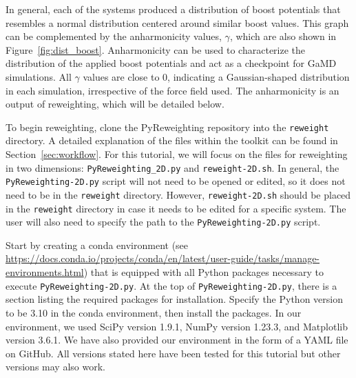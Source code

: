 \documentclass[9pt,tutorial]{livecoms}
\begin{document}
In general, each of the systems produced a distribution of boost potentials that resembles a normal distribution centered around similar boost values. This graph can be complemented by the anharmonicity values, $\gamma$, which are also shown in Figure~\ref{fig:dist_boost}. Anharmonicity can be used to characterize the distribution of the applied boost potentials and act as a checkpoint for GaMD simulations. All $\gamma$ values are close to 0, indicating a Gaussian-shaped distribution in each simulation, irrespective of the force field used. The anharmonicity is an output of reweighting, which will be detailed below.

To begin reweighting, clone the PyReweighting repository into the \texttt{reweight} directory. A detailed explanation of the files within the toolkit can be found in Section~\ref{sec:workflow}. For this tutorial, we will focus on the files for reweighting in two dimensions: \texttt{PyReweighting\_2D.py} and \texttt{reweight-2D.sh}. In general, the \texttt{PyReweighting-2D.py} script will not need to be opened or edited, so it does not need to be in the \texttt{reweight} directory. However, \texttt{reweight-2D.sh} should be placed in the \texttt{reweight} directory in case it needs to be edited for a specific system. The user will also need to specify the path to the \texttt{PyReweighting-2D.py} script. 

Start by creating a conda environment (see \url{https://docs.conda.io/projects/conda/en/latest/user-guide/tasks/manage-environments.html}) that is equipped with all Python packages necessary to execute \texttt{PyReweighting-2D.py}. At the top of \texttt{PyReweighting-2D.py}, there is a section listing the required packages for installation. Specify the Python version to be 3.10 in the conda environment, then install the packages. In our environment, we used SciPy version 1.9.1, NumPy version 1.23.3, and Matplotlib version 3.6.1. We have also provided our environment in the form of a YAML file on GitHub. All versions stated here have been tested for this tutorial but other versions may also work. 
\end{document}
